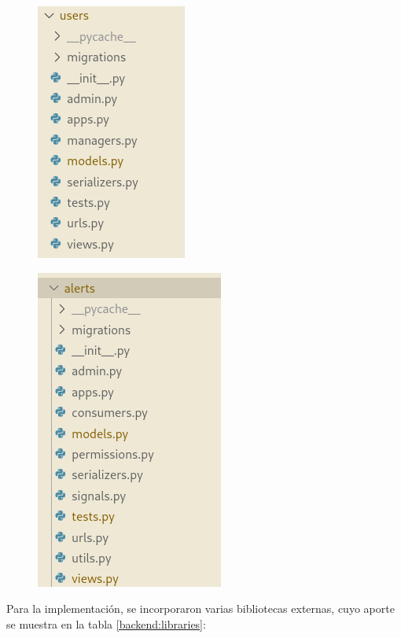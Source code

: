 \begin{figure}[H]
\centering
\begin{minipage}{.5\textwidth}
  \centering
  \includegraphics[width=.4\linewidth]{./Figures/backend-folder1.png}
  \label{backend:folder1}
\end{minipage}%
\begin{minipage}{.5\textwidth}
  \centering
  \includegraphics[width=.4\linewidth]{./Figures/backend-folder2.png}
  \label{backend:folder2}
\end{minipage}
\end{figure}

Para la implementación, se incorporaron varias bibliotecas externas, cuyo aporte se muestra en la tabla \ref{backend:libraries}:

